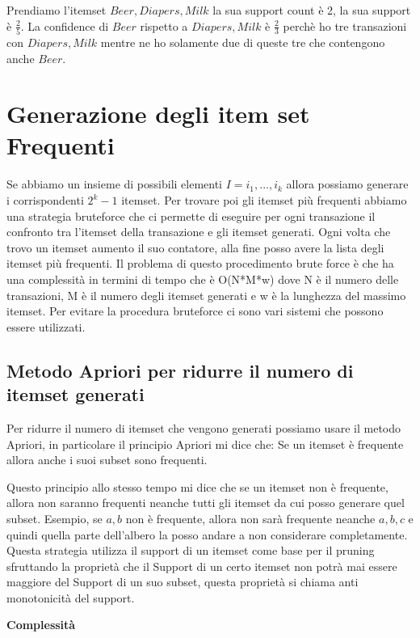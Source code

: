 \documentclass[14pt]{extreport}
\begin{document}
Prendiamo l'itemset ${Beer, Diapers, Milk}$ la sua support count è 2, la sua support è $\frac{2}{5}$. La confidence di ${Beer}$ rispetto a ${Diapers, Milk}$ è $\frac{2}{3}$ perchè ho tre transazioni con ${Diapers, Milk}$ mentre ne ho solamente due di queste tre che contengono anche $Beer$.

\section{Generazione degli item set Frequenti}

Se abbiamo un insieme di possibili elementi $I = {i_1,...,i_k}$ allora possiamo generare i corrispondenti $2^k-1$ itemset. Per trovare poi gli itemset più frequenti abbiamo una strategia bruteforce che ci permette di eseguire per ogni transazione il confronto tra l'itemset della transazione e gli itemset generati. Ogni volta che trovo un itemset aumento il suo contatore, alla fine posso avere la lista degli itemset più frequenti. Il problema di questo procedimento brute force è che ha una complessità in termini di tempo che è O(N*M*w) dove N è il numero delle transazioni, M è il numero degli itemset generati e w è la lunghezza del massimo itemset.
Per evitare la procedura bruteforce ci sono vari sistemi che possono essere utilizzati.

\subsection{Metodo Apriori per ridurre il numero di itemset generati}

Per ridurre il numero di itemset che vengono generati possiamo usare il metodo Apriori, in particolare il principio Apriori mi dice che:
\newline    
Se un itemset è frequente allora anche i suoi subset sono frequenti.

Questo principio allo stesso tempo mi dice che se un itemset non è frequente, allora non saranno frequenti neanche tutti gli itemset da cui posso generare quel subset. Esempio, se ${a,b}$ non è frequente, allora non sarà frequente neanche ${a,b,c}$ e quindi quella parte dell'albero la posso andare a non considerare completamente. Questa strategia utilizza il support di un itemset come base per il pruning sfruttando la proprietà che il Support di un certo itemset non potrà mai essere maggiore del Support di un suo subset, questa proprietà si chiama anti monotonicità del support.

\textbf{Complessità}
\end{document}
